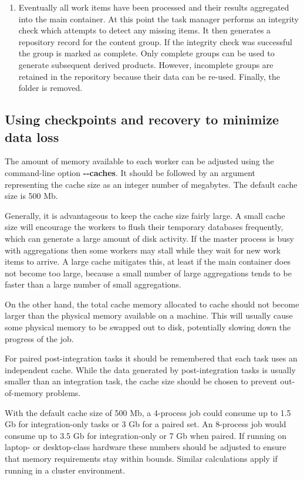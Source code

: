 \documentclass[11pt,a4paper]{article}
\renewcommand{\texttt}[1]{{\ttfamily\fontseries{l}\selectfont{#1}}}
\newcounter{advancedbox}[section]
\newenvironment{advanced}[1]{\stepcounter{advancedbox}\begin{tcolorbox}[enhanced,breakable,colback=red!10,colbacktitle=red!20,colframe=red!40,coltitle=black,title={Advanced usage: {#1}},fonttitle=\sffamily\fontseries{b}\selectfont]}{\end{tcolorbox}}
\newcommand{\file}[1]{\texttt{{#1}}}
\newcommand{\option}[1]{{\ttfamily\bfseries\small #1}}
\begin{document}
\begin{enumerate}
    \item Eventually all work items have been processed
    and their results aggregated into the main container.
    At this point the task manager performs an integrity check
    which attempts to detect any missing items.
    It then generates a repository record for the content group.
    If the integrity check was successful the group is marked
    as complete.
    Only complete groups can be used to generate subsequent
    derived products.
    However,
    incomplete groups are retained in the repository because their
    data can be re-used.
    Finally, the \file{tempfiles} folder is removed.
\end{enumerate}

\subsection{Using checkpoints and recovery to minimize data loss}
\label{sec:checkpointing}
The amount of memory available to each worker can be adjusted using
the command-line option
\option{{-}{-}caches}.
It should be followed by an argument representing the cache size
as an integer number of megabytes.
The default cache size is 500 Mb.

Generally, it is advantageous to keep the cache size fairly large.
A small cache size will encourage the workers to flush their
temporary databases frequently, which can generate a large amount
of disk activity.
If the master process is busy with aggregations then
some workers may stall while they wait for new work items to arrive.
A large cache mitigates this, at least if the main container
does not become too large, because a small number of
large aggregations tends to be faster than a large number of small
aggregations.

On the other hand, the total cache memory
allocated to cache should not become larger than the physical
memory available on a machine.
This will usually cause some physical memory to be swapped
out to disk, potentially slowing down the progress of the job.

\begin{advanced}{Estimating cache requirements with paired tasks}
    For paired post-integration tasks it should be remembered that
    each task uses an independent cache.
    While the data generated by post-integration tasks is usually
    smaller than an integration task, the cache size should be
    chosen to prevent out-of-memory problems.
    
    With the default cache size of 500 Mb, a 4-process job could
    consume up to 1.5 Gb for integration-only tasks
    or 3 Gb for a paired set.
    An 8-process job would consume up to 3.5 Gb for
    integration-only or 7 Gb when paired.
    If running on laptop- or desktop-class hardware these numbers
    should be adjusted to ensure that memory requirements stay within
    bounds.
    Similar calculations apply if running in a cluster environment.
\end{advanced}
\end{document}
